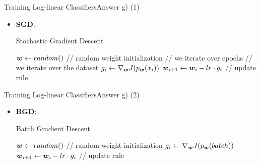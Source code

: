 \documentclass[t]{beamer}
\begin{document}
\begin{frame}{Training Log-linear Classifiers}{Answer g) (1)}
    \begin{itemize}
        \item \textbf{SGD}:
              {\small
              \begin{algorithm}[H]
                  \caption{Stochastic Gradient Descent}
                  \label{alg:sgd}
                  \begin{algorithmic}[1]
                      \State ${\boldsymbol{w}}\leftarrow random()$ \qquad   // random weight initialization
                       \qquad   // we iterate over epochs
                       \qquad   // we iterate over the dataset
                      \State $g_i\leftarrow \nabla_{{\boldsymbol{w}}}J(p_{{\boldsymbol{w}}}(x_i))$
                      \State ${\boldsymbol{w}}_{i+1}\leftarrow {\boldsymbol{w}}_i - lr \cdot g_i$ \qquad   // update rule
                      \EndFor
                      \EndFor
                      \EndProcedure
                  \end{algorithmic}
              \end{algorithm}
              }
    \end{itemize}
\end{frame}

\begin{frame}{Training Log-linear Classifiers}{Answer g) (2)}
    \begin{itemize}
        \item \textbf{BGD}:
              {\small
              \begin{algorithm}[H]
                  \caption{Batch Gradient Descent}
                  \label{alg:bgd}
                  \begin{algorithmic}[1]
                      \State ${\boldsymbol{w}}\leftarrow random()$ \qquad   // random weight initialization
                      \State $g_i\leftarrow \nabla_{{\boldsymbol{w}}}J(p_{{\boldsymbol{w}}}(batch))$
                      \State ${\boldsymbol{w}}_{i+1}\leftarrow {\boldsymbol{w}}_i - lr \cdot g_i$ \qquad   // update rule
                      \EndFor
                      \EndFor
                      \EndProcedure
                  \end{algorithmic}
              \end{algorithm}
              }
    \end{itemize}
\end{frame}
\end{document}
